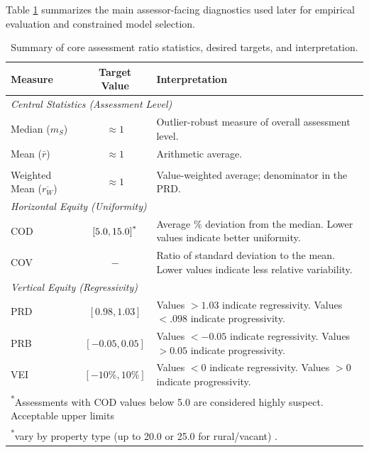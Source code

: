 \documentclass[12pt]{article}
\theoremstyle{plain}
\theoremstyle{definition}
\newcommand{\1}{\mathbf{1}}
\begin{document}
Table \ref{tab:assessment_metrics_summary} summarizes the main assessor-facing diagnostics used later for empirical evaluation and constrained model selection.

\begin{table}[!ht]
\centering
\caption{Summary of core assessment ratio statistics, desired targets, and interpretation.}
\label{tab:assessment_metrics_summary}
\begin{tabular}{lcp{8.5cm}}
\toprule
\textbf{Measure} & \textbf{Target Value} & \textbf{Interpretation} \\
\midrule 
\multicolumn{3}{l}{\textit{Central Statistics (Assessment Level)}} \vspace{3mm} \\
Median ($m_S$) & \(\approx 1\) & Outlier-robust measure of overall assessment level. \\
Mean ($\bar r$) & \(\approx 1\) & Arithmetic average. \\\\
Weighted Mean ($\overline{r_W}$) & \(\approx 1\) & Value-weighted average; denominator in the PRD. \\
\midrule
\multicolumn{3}{l}{\textit{Horizontal Equity (Uniformity)}} \vspace{3mm} \\
COD & \([5.0,15.0]\textsuperscript{*}\) & Average \% deviation from the median. Lower values indicate better uniformity. \\
COV & $-$ & Ratio of standard deviation to the mean. Lower values indicate less relative variability. \\
\midrule
\multicolumn{3}{l}{\textit{Vertical Equity (Regressivity)}} \vspace{3mm} \\
PRD & \([0.98,1.03]\) & Values \(>1.03\) indicate regressivity. Values \(<.098\) indicate progressivity. \\
PRB & \([-0.05,0.05]\) & Values \(<-0.05\) indicate regressivity. Values \(>0.05\) indicate progressivity. \\
VEI & \([-10\%,10\%]\) & Values \(<0\) indicate regressivity. Values \(>0\) indicate progressivity.\\
\bottomrule
\multicolumn{3}{l}{\footnotesize \textsuperscript{*}Assessments with COD values below 5.0 are considered highly suspect. Acceptable upper limits} \\
\multicolumn{3}{l}{\footnotesize {\color{white}\textsuperscript{*}}vary by property type (up to 20.0 or 25.0 for rural/vacant) \cite{IAAO2025ExposureRatio}.}
\end{tabular}
\end{table}
\end{document}
